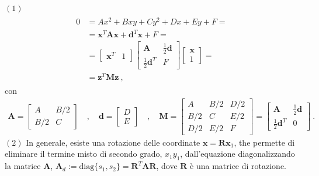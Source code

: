 \documentclass[letterpaper,10pt,italian]{jupyterBook}
\begin{document}
\sphinxAtStartPar
\((1)\) 
\begin{equation*}
\begin{split}\begin{aligned}
0 
  & = A x^2 + B x y + C y^2 + D x + E y + F = \\
  & = \mathbf{x}^T \mathbf{A} \mathbf{x} + \mathbf{d}^T \mathbf{x} + F = \\
  & = \begin{bmatrix} \mathbf{x}^T & 1 \end{bmatrix} \begin{bmatrix} \mathbf{A} & \frac{1}{2} \mathbf{d} \\ \frac{1}{2} \mathbf{d}^T & F \end{bmatrix} \begin{bmatrix} \mathbf{x} \\ 1 \end{bmatrix} = \\
  & = \mathbf{z}^T \mathbf{M} \mathbf{z} \ ,
\end{aligned}\end{split}
\end{equation*}
\sphinxAtStartPar
con
\begin{equation*}
\begin{split}\mathbf{A} = \begin{bmatrix} A & B/2 \\ B/2 & C \end{bmatrix} \quad , \quad \mathbf{d} = \begin{bmatrix} D \\  E \end{bmatrix} \quad , \quad \mathbf{M} = \begin{bmatrix} A & B/2 & D/2 \\ B/2 & C & E/2 \\ D/2 & E/2 & F \end{bmatrix} = \begin{bmatrix} \mathbf{A} & \frac{1}{2}\mathbf{d} \\ \frac{1}{2} \mathbf{d}^T & 0 \end{bmatrix} \ .\end{split}
\end{equation*}
\sphinxAtStartPar
\((2)\)  In generale, esiste una rotazione delle coordinate \(\mathbf{x} = \mathbf{R} \mathbf{x}_1\), the permette di eliminare il termine misto di secondo grado, \(x_1 y_1\), dall’equazione diagonalizzando la matrice \(\mathbf{A}\), \(\mathbf{A}_d := \text{diag}\{ s_1, s_2 \} = \mathbf{R}^T \mathbf{A} \mathbf{R}\), dove \(\mathbf{R}\) è una matrice di rotazione.
\end{document}
